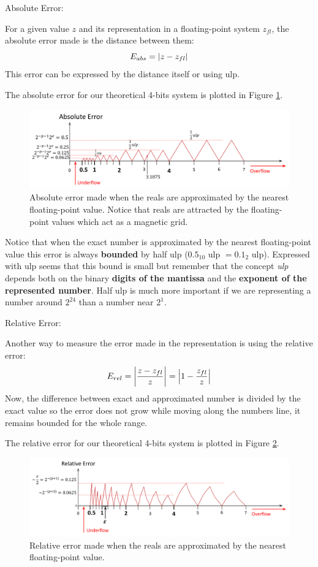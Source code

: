 {\large Absolute Error:}

For a given value $z$ and its representation in a floating-point system $z_{fl}$, 
the absolute error made is the distance between them:
$$
E_{abs} = \abs{z - z_{fl}} 
$$
This error can be expressed by the distance itself or using ulp.

The absolute error for our theoretical 4-bits system is plotted in Figure \ref{fig:AbsErrorGraph}.
\begin{figure}[h]
    \centering
    \includegraphics[width= \textwidth]{./doc/Figures/AbsErrorGraph.png}
    \caption{Absolute error made when the reals are approximated by the nearest floating-point value. Notice that reals are attracted by the floating-point values which act as a magnetic grid.}
    \label{fig:AbsErrorGraph}
\end{figure}

Notice that when the exact number is approximated by the nearest floating-point value 
this error is always \textbf{bounded} by half ulp ($0.5_{10}$ ulp $= 0.1_2$ ulp). 
Expressed with ulp seems that this bound is small but remember that the concept \textit{ulp} depends both on 
the binary \textbf{digits of the mantissa} and the \textbf{exponent of the represented number}.
Half ulp is much more important if we are representing a number around $2^{24}$ than a number near $2^1$.






{\large Relative Error:}

Another way to measure the error made in the representation is using the relative error:
$$
E_{rel} = \abs{\frac{z - z_{fl}}{z}} = \abs{1 - \frac{z_{fl}}{z}}
$$
Now, the difference between exact and approximated number is divided by the exact value so
the error does not grow while moving along the numbers line, 
it remains bounded for the whole range. 

The relative error for our theoretical 4-bits system is plotted in Figure \ref{fig:RelErrorGraph}.
\begin{figure}[h]
    \centering
    \includegraphics[width= \textwidth]{./doc/Figures/RelErrorGraph.png}
    \caption{Relative error made when the reals are approximated by the nearest floating-point value.}
    \label{fig:RelErrorGraph}
\end{figure}


